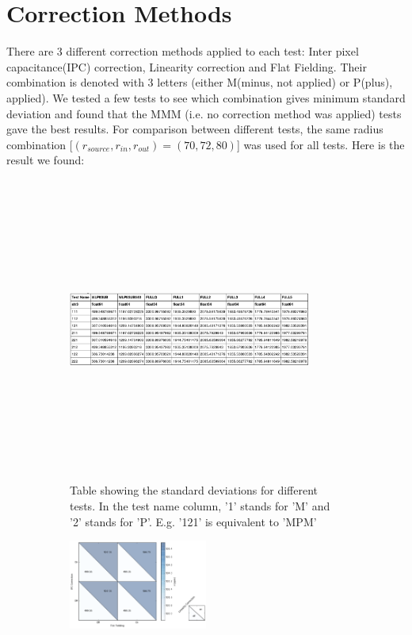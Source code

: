 \documentclass[conference]{IEEEtran}
\begin{document}
\section{Correction Methods}
There are 3 different correction methods applied to each test: Inter pixel capacitance(IPC) correction, Linearity correction and Flat Fielding. Their combination is denoted with 3 letters (either M(minus, not applied) or P(plus), applied). We tested a few tests to see which combination gives minimum standard deviation and found that the MMM (i.e. no correction method was applied) tests gave the best results. For comparison between different tests, the same radius combination [$(r_{source}, r_{in}, r_{out}) = (70, 72, 80)$] was used for all tests. Here is the result we found:  
\begin{figure}[H]
    \centering
    \begin{subfigure}{1}
        \includegraphics[width=8cm,height=10cm,keepaspectratio]{correction}
        \caption{Table showing the standard deviations for different tests. In the test name column, '1' stands for 'M' and '2' stands for 'P'. E.g. '121' is equivalent to 'MPM'}
    \end{subfigure}

    \begin{subfigure}{2}
        \includegraphics[width=0.5\textwidth]{correction1}
    \end{subfigure}
    

\end{figure}
\end{document}
